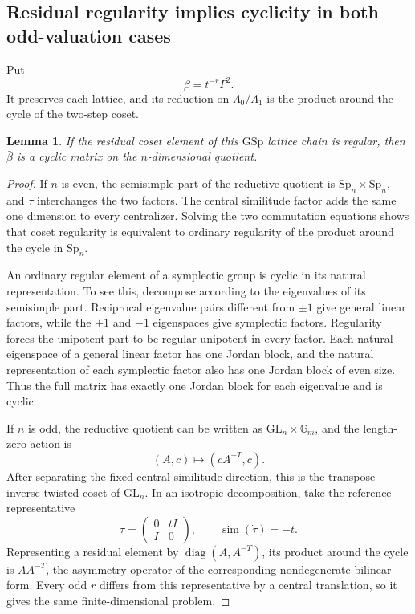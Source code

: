 \documentclass[11pt,a4paper]{article}
\newtheorem{lemma}[theorem]{Lemma}
\theoremstyle{definition}
\theoremstyle{remark}
\begin{document}
\subsection{Residual regularity implies cyclicity in both odd-valuation
cases}

Put
\[
\beta=t^{-r}\Gamma^2.
\]
It preserves each lattice, and its reduction on
\(\Lambda_0/\Lambda_1\) is the product around the cycle of the two-step
coset.

\begin{lemma}\label{lem:ac-gsp-cyclic}
If the residual coset element of this \(\mathrm{GSp}\) lattice chain is
regular, then \(\bar\beta\) is a cyclic matrix on the
\(n\)-dimensional quotient.
\end{lemma}

\begin{proof}
If \(n\) is even, the semisimple part of the reductive quotient is
\(\mathrm{Sp}_n\times\mathrm{Sp}_n\), and \(\tau\) interchanges the two
factors. The central similitude factor adds the same one dimension to
every centralizer. Solving the two commutation equations shows that
coset regularity is equivalent to ordinary regularity of the product
around the cycle in \(\mathrm{Sp}_n\).

An ordinary regular element of a symplectic group is cyclic in its
natural representation. To see this, decompose according to the
eigenvalues of its semisimple part. Reciprocal eigenvalue pairs different
from \(\pm1\) give general linear factors, while the \(+1\) and \(-1\)
eigenspaces give symplectic factors. Regularity forces the unipotent
part to be regular unipotent in every factor. Each natural eigenspace of
a general linear factor has one Jordan block, and the natural
representation of each symplectic factor also has one Jordan block of
even size. Thus the full matrix has exactly one Jordan block for each
eigenvalue and is cyclic.

If \(n\) is odd, the reductive quotient can be written as
\(\mathrm{GL}_n\times\mathbb G_m\), and the length-zero action is
\[
(A,c)\longmapsto(cA^{-T},c).
\]
After separating the fixed central similitude direction, this is the
transpose-inverse twisted coset of \(\mathrm{GL}_n\). In an isotropic
decomposition, take the reference representative
\[
\dot\tau=
\begin{pmatrix}0&tI\\ I&0\end{pmatrix},\qquad
\operatorname{sim}(\dot\tau)=-t.
\]
Representing a residual element by
\(\operatorname{diag}(A,A^{-T})\), its product around the cycle is
\(AA^{-T}\), the asymmetry operator of the corresponding nondegenerate
bilinear form. Every odd \(r\) differs from this representative by a
central translation, so it gives the same finite-dimensional problem.


\end{proof}
\end{document}
